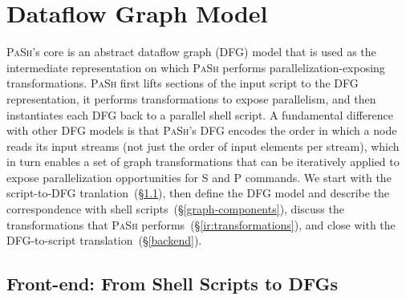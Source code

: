 \documentclass[sigplan, review, screen, anonymous]{acmart}
\newcommand{\tcn}[1]{\mbox{\textcircled{\scriptsize #1}}}
\newcommand{\tsta}{\tcn{\textsc{S}}\xspace}
\newcommand{\tpur}{\tcn{\textsc{P}}\xspace}
\newcommand{\nv}[1]{[{\color{cyan}nv: #1}]}
\newcommand{\kk}[1]{[{\color{magenta}kk: #1}]}
\newcommand{\tr}[1]{} %
\newcommand{\sx}[1]{(\S\ref{#1})}
\newcommand{\sys}{{\scshape PaSh}\xspace}
\begin{document}
\tr{\kk{I am not sure a general interface is so easy to design. It needs
  more though. It might be beneficial to just talk about sort and wc
  here and how we implemented them and nothing more. Or maybe this
  could then go to the implementation? Or maybe say that one can write
  a python function that given a node of the graph, transforms it into
  many. I am not sure what is best...}}


\tr{Can we find a solution for the commands in coreutils?}


\section{Dataflow Graph Model}
\label{ir}

\sys's core is an abstract dataflow graph (DFG) model that is used as the intermediate representation on which \sys performs parallelization-exposing transformations.
\sys first lifts sections of the input script to the DFG
representation, it performs transformations to expose parallelism, and
then instantiates each DFG back to a parallel shell script.  A
fundamental difference with other DFG models is that \sys's DFG encodes the
order in which a node reads its input streams (not just the order of input elements per stream), which in turn enables a set of
graph transformations that can be iteratively applied to expose
parallelization opportunities for \tsta and \tpur commands.
We start with the script-to-DFG tranlation~\sx{dataflow-regions}, 
  then define the DFG model and describe the correspondence with shell scripts~\sx{graph-components},
  discuss the transformations that \sys performs~\sx{ir:transformations}, and close with
  the DFG-to-script translation~\sx{backend}.


\subsection{Front-end: From Shell Scripts to DFGs}
\label{dataflow-regions}
\end{document}
